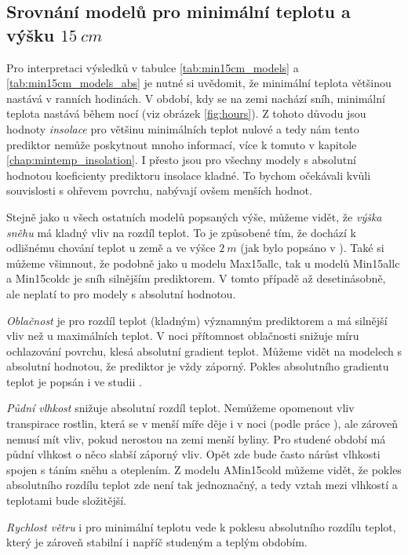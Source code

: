 \subsection{Srovnání modelů pro minimální teplotu a výšku $\SI{15}{cm}$}
Pro interpretaci výsledků v tabulce \ref{tab:min15cm_models} a \ref{tab:min15cm_models_abs} je nutné si uvědomit, že minimální teplota většinou nastává v ranních hodinách. V období, kdy se na zemi nachází sníh, minimální teplota nastává během nocí (viz obrázek \ref{fig:hours}). Z tohoto důvodu jsou hodnoty \textit{insolace} pro většinu minimálních teplot nulové a tedy nám tento prediktor nemůže poskytnout mnoho informací, více k tomuto v kapitole \ref{chap:mintemp_insolation}. I přesto jsou pro všechny modely s absolutní hodnotou koeficienty prediktoru insolace kladné. To bychom očekávali kvůli souvislosti s ohřevem povrchu, nabývají ovšem menších hodnot.

Stejně jako u všech ostatních modelů popsaných výše, můžeme vidět, že \textit{výška sněhu} má kladný vliv na rozdíl teplot. To je způsobené tím, že dochází k odlišnému chování teplot u země a ve výšce $\SI{2}{m}$ (jak bylo popsáno v \cite{snow_deFrenneForestMicroclimates}). Také si můžeme všimnout, že podobně jako u modelu Max15allc, tak u modelů Min15allc a Min15coldc je sníh silnějším prediktorem. V tomto případě až desetinásobně, ale neplatí to pro modely s absolutní hodnotou.

\textit{Oblačnost} je pro rozdíl teplot (kladným) významným prediktorem a má silnější vliv než u maximálních teplot. V noci přítomnost oblačnosti snižuje míru ochlazování povrchu, klesá absolutní gradient teplot. Můžeme vidět na modelech s absolutní hodnotou, že prediktor je vždy záporný. Pokles absolutního gradientu teplot je popsán i ve studii \cite{cloud_overwinteringclusters}. 

\textit{Půdní vlhkost} snižuje absolutní rozdíl teplot. Nemůžeme opomenout vliv transpirace rostlin, která se v menší míře děje i v noci (podle práce \cite{nighttranspiration}), ale zároveň nemusí mít vliv, pokud nerostou na zemi menší byliny. Pro studené období má půdní vlhkost o něco slabší záporný vliv. Opět zde bude často nárůst vlhkosti spojen s táním sněhu a oteplením. Z modelu AMin15cold můžeme vidět, že pokles absolutního rozdílu teplot zde není tak jednoznačný, a tedy vztah mezi vlhkostí a teplotami bude složitější.

\textit{Rychlost větru} i pro minimální teplotu vede k poklesu absolutního rozdílu teplot, který je zároveň stabilní i napříč studeným a teplým obdobím.

